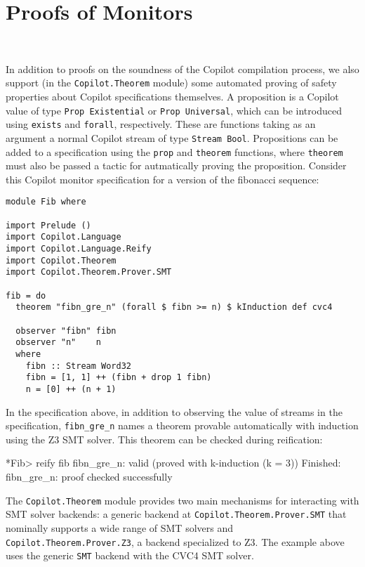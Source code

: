 \section{Proofs of Monitors}~\label{sec:proof}

In addition to proofs on the soundness of the Copilot compilation process, we
also support (in the {\tt Copilot.Theorem} module) some automated proving of
safety properties about Copilot specifications themselves. A proposition is a
Copilot value of type \lstinline{Prop Existential} or \lstinline{Prop
Universal}, which can be introduced using \lstinline{exists} and
\lstinline{forall}, respectively. These are functions taking as an argument a
normal Copilot stream of type \lstinline{Stream Bool}. Propositions can be added
to a specification using the \lstinline{prop} and \lstinline{theorem} functions,
where \lstinline{theorem} must also be passed a tactic for autmatically proving
the proposition. Consider this Copilot monitor specification for a version of
the fibonacci sequence:

\begin{lstlisting}[language = Copilot]
module Fib where

import Prelude ()
import Copilot.Language
import Copilot.Language.Reify
import Copilot.Theorem
import Copilot.Theorem.Prover.SMT

fib = do
  theorem "fibn_gre_n" (forall $ fibn >= n) $ kInduction def cvc4

  observer "fibn" fibn
  observer "n"    n
  where
    fibn :: Stream Word32
    fibn = [1, 1] ++ (fibn + drop 1 fibn)
    n = [0] ++ (n + 1)
\end{lstlisting}

In the specification above, in addition to observing the value of streams in
the specification, \lstinline{fibn_gre_n} names a theorem provable
automatically with induction using the Z3 SMT solver. This theorem can be
checked during reification:

\begin{code}
*Fib> reify fib
fibn_gre_n: valid (proved with k-induction (k = 3))
Finished: fibn_gre_n: proof checked successfully
\end{code}

The {\tt Copilot.Theorem} module provides two main mechanisms for interacting
with SMT solver backends: a generic backend at {\tt Copilot.Theorem.Prover.SMT}
that nominally supports a wide range of SMT solvers and {\tt
Copilot.Theorem.Prover.Z3}, a backend specialized to Z3. The example above uses
the generic {\tt SMT} backend with the CVC4 SMT solver.


